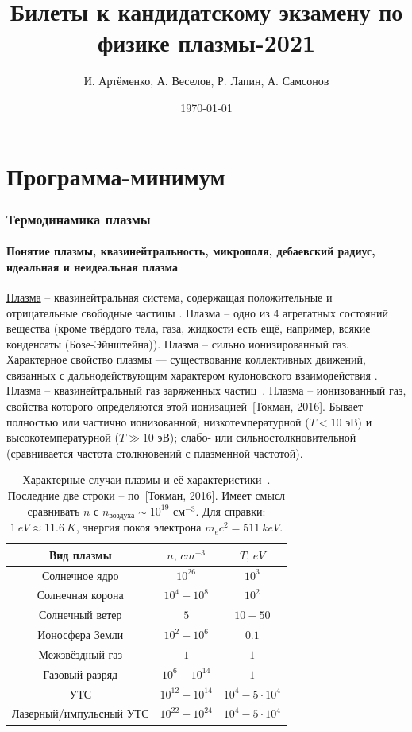 \documentclass[10pt, a4paper]{article}
\title{Билеты к кандидатскому экзамену по физике плазмы-2021}
\author{И. Артёменко, А. Веселов, Р. Лапин, А. Самсонов}
\date{\today}
\newcommand{\Tokman}{~[Токман, 2016]}
\let\stdsection\section
\renewcommand\section{\newpage\stdsection}
\let\stdpart\part
\renewcommand{\part}{\newpage\stdpart}
\begin{document}
\maketitle

\tableofcontents

\part{Программа-минимум}

\section{Термодинамика плазмы}

\subsection{Понятие плазмы, квазинейтральность, микрополя, дебаевский радиус, идеальная и неидеальная плазма}

\uline{Плазма} -- квазинейтральная система, содержащая положительные и отрицательные свободные частицы \cite{frank}. Плазма -- одно из 4 агрегатных состояний вещества (кроме твёрдого тела, газа, жидкости есть ещё, например, всякие конденсаты (Бозе-Эйнштейна)). Плазма -- сильно ионизированный газ. Характерное свойство плазмы — существование коллективных
движений, связанных с дальнодействующим характером кулоновского взаимодействия \cite{kroll}. Плазма -- квазинейтральный газ заряженных частиц~\cite{kotelnikov}. Плазма -- ионизованный газ, свойства которого определяются этой ионизацией\Tokman. Бывает полностью или частично ионизованной; низкотемпературной ($T<10$ эВ) и высокотемпературной ($T\gg10$ эВ); слабо- или сильностолкновительной (сравнивается частота столкновений с плазменной частотой).

\begin{table}[ht]
	\caption{Характерные случаи плазмы и её характеристики~\cite{kotelnikov}. Последние две строки -- по\Tokman. Имеет смысл сравнивать $n$ с $n_\text{воздуха} \sim 10^{19}$ см$^{-3}$.	Для справки: $1\ eV \approx 11.6\ K$, энергия покоя электрона $m_e c^2 = 511\ keV$.}
	\begin{center}
		\begin{tabular}{|c|c|c|}
			\hline
			Вид плазмы & $n,\,cm^{-3}$ & $T,\,eV$ \\ \hline
			Солнечное ядро & $10^{26}$ & $10^3$ \\
			Солнечная корона & $10^4-10^8$ & $10^2$ \\
			Солнечный ветер & $5$ & $10-50$ \\
			Ионосфера Земли & $10^2-10^6$ & $0.1$ \\
			Межзвёздный газ & $1$ & $1$ \\
			Газовый разряд & $10^{6}-10^{14}$ & $1$ \\
			УТС & $10^{12}-10^{14}$ & $10^4-5\cdot10^4$ \\
			Лазерный/импульсный УТС & $10^{22}-10^{24}$ & $10^4-5\cdot10^4$ \\
			\hline
		\end{tabular}
	\end{center}
\end{table}
\end{document}
